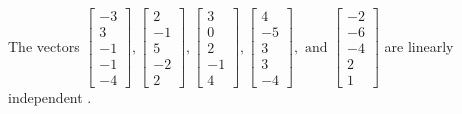 \begin{exercise}
\begin{exerciseStatement}
  \end{exerciseStatement}
  \begin{exerciseAnswer}
   The vectors \(\left[\begin{array}{r}
-3 \\
3 \\
-1 \\
-1 \\
-4
\end{array}\right] , \left[\begin{array}{r}
2 \\
-1 \\
5 \\
-2 \\
2
\end{array}\right] , \left[\begin{array}{r}
3 \\
0 \\
2 \\
-1 \\
4
\end{array}\right] , \left[\begin{array}{r}
4 \\
-5 \\
3 \\
3 \\
-4
\end{array}\right] , \text{ and } \left[\begin{array}{r}
-2 \\
-6 \\
-4 \\
2 \\
1
\end{array}\right]\) are 
  	 linearly independent  .
  


  \end{exerciseAnswer}
\end{exercise}